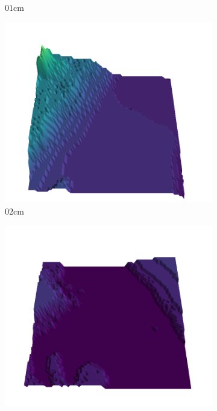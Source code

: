 \documentclass[../document.tex]{subfiles}
\begin{document}
\begin{figure}[H]
\begin{subfigure}[b]{0.19\textwidth}
        \caption{$01$cm}
        \end{subfigure}
        \begin{subfigure}[b]{0.19\textwidth}
        \includegraphics[width=\linewidth]{../img/5/quarry/all/worst/02-patch-3d-majavi-colormap-4.png}
        \caption{$02$cm}
        \end{subfigure}
        \begin{subfigure}[b]{0.19\textwidth}
        \includegraphics[width=\linewidth]{../img/5/quarry/all/worst/03-patch-3d-majavi-colormap-5.png}

\end{subfigure}
\end{figure}
\end{document}
